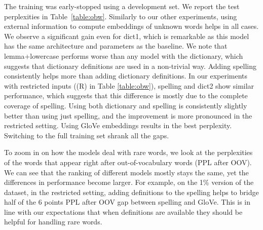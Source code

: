 The training was early-stopped using a development set. We report the test perplexities in Table~\ref{table:obw}. Similarly to our other experiments, using external information to compute embeddings of unknown words helps in all cases. We observe a significant gain even for dict1, which is remarkable as this model has the same architecture  and parameters as the baseline. We note that lemma+lowercase performs worse than any model with the dictionary, which suggests that  dictionary definitions are used in a non-trivial way. Adding spelling consistently helps more than adding dictionary definitions. In our experiments with restricted inputs ((R) in Table \ref{table:obw}), spelling and dict2 show similar performance, which suggests that this difference is mostly due to the complete coverage of spelling. Using both dictionary and spelling is consistently slightly better than using just spelling, and the improvement is more pronounced in the restricted setting. Using GloVe embeddings results in the best perplexity. Switching to the full training set shrank all the gaps. 





To zoom in on how the models deal with rare words, we look at the perplexities of the words that appear right after out-of-vocabulary words (PPL after OOV). We can see that the ranking of different models mostly stays the same, yet the differences in performance become larger. For example, on the 1\% version of the dataset, in the restricted setting, adding definitions to the spelling helps to bridge half of the 6 points PPL after OOV gap between spelling and GloVe. This is in line with our expectations that when definitions are available they should be helpful for handling rare words.


